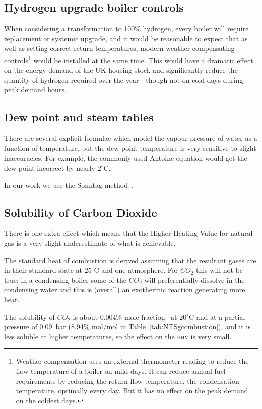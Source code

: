 \documentclass[5p]{elsarticle} %
\begin{document}
\subsection{Hydrogen upgrade boiler controls}
\label{appendix:h2controls}
When considering a transformation to 100\% hydrogen, every boiler will require replacement or systemic upgrade, and it would be reasonable to expect that as well as setting correct return temperatures, modern weather-compensating controls\footnote{
Weather compensation uses an external thermometer reading to reduce the flow temperature of a boiler on mild days. It can reduce annual fuel requirements by reducing the return flow temperature, the condensation temperature, optimally every day. But it has no effect on the peak demand on the coldest days.
}
would be installed at the same time. This would have a dramatic effect on the energy demand of the UK housing stock and  significantly reduce the quantity of hydrogen required over the  year - though not on cold days during peak demand hours.

\subsection{Dew point and steam tables}
\label{appendix:steam-tables}
There are several explicit formulae which model the vapour pressure of water as a function of temperature, but the dew point temperature is very sensitive to slight inaccuracies. For example, the commonly used Antoine equation would get the dew point incorrect by nearly $2^\circ$C.

In our work we use the Sonntag method~\citep{Perry2008}.

\subsection{Solubility of Carbon Dioxide}
\label{sec:CO2solubility}
There is one extra effect which means that the Higher Heating Value for natural gas is a very slight underestimate of what is achievable.

The standard heat of combustion is derived assuming that the resultant gases are in their standard state at $25^\circ$C and one atmosphere. For $CO_2$ this will not be true: in a condensing boiler some of the $CO_2$ will preferentially dissolve in the condensing water and this is (overall) an exothermic reaction generating more heat.

The solubility of $CO_2$ is about 0.004\% mole fraction~\citep{Carroll1991} at $20^\circ$C and at a partial-pressure of 0.09~bar (8.94\% mol/mol in Table~\ref{tab:NTSgcombustion}), and it is less soluble at higher temperatures, so the effect on the \textsc{hhv} is very small.
\end{document}
